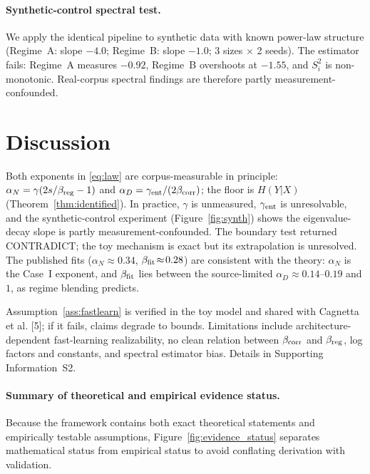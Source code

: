 \documentclass[12pt]{article}
\theoremstyle{remark}
\begin{document}
\paragraph{Synthetic-control spectral test.}
\label{numerics:synth}
We apply the identical pipeline to synthetic data with known power-law
structure (Regime~A: slope $-4.0$; Regime~B: slope $-1.0$; 3 sizes $\times$ 2
seeds). The estimator fails: Regime~A measures $-0.92$, Regime~B overshoots at
$-1.55$, and $S_i^2$ is non-monotonic. Real-corpus spectral findings are
therefore partly measurement-confounded.

\section{Discussion}
\label{sec:discussion}

Both exponents in \eqref{eq:law} are corpus-measurable in principle:
$\alpha_N=\gamma(2s/\beta_{\rm reg}-1)$ and
$\alpha_D=\gamma_{\rm ent}/(2\beta_{\rm corr})$; the floor is
$H(Y|X)$ (Theorem~\ref{thm:identified}).  In practice, $\gamma$ is unmeasured,
$\gamma_{\rm ent}$ is unresolvable, and the synthetic-control experiment (Figure~\ref{fig:synth}) shows
the eigenvalue-decay slope is partly measurement-confounded.  The boundary test
returned CONTRADICT; the toy mechanism is exact but its extrapolation is
unresolved.  The published fits ($\alpha_N\!\approx\!0.34$,
$\beta_{\rm fit}\!\approx\!0.28$) are consistent with the theory: $\alpha_N$ is
the Case~I exponent, and $\beta_{\rm fit}$ lies between the source-limited
$\alpha_D\!\approx\!0.14$--$0.19$ and $1$, as regime blending predicts.

Assumption~\ref{ass:fastlearn} is verified in the toy model and shared with
Cagnetta et al. [5]; if it fails, claims degrade to bounds.  Limitations include
architecture-dependent fast-learning realizability, no clean relation between
$\beta_{\rm corr}$ and $\beta_{\rm reg}$, log factors and constants, and
spectral estimator bias.  Details in Supporting Information~S2.

\paragraph{Summary of theoretical and empirical evidence status.}
Because the framework contains both exact theoretical statements and
empirically testable assumptions, Figure~\ref{fig:evidence_status} separates
mathematical status from empirical status to avoid conflating derivation with
validation.
\end{document}
